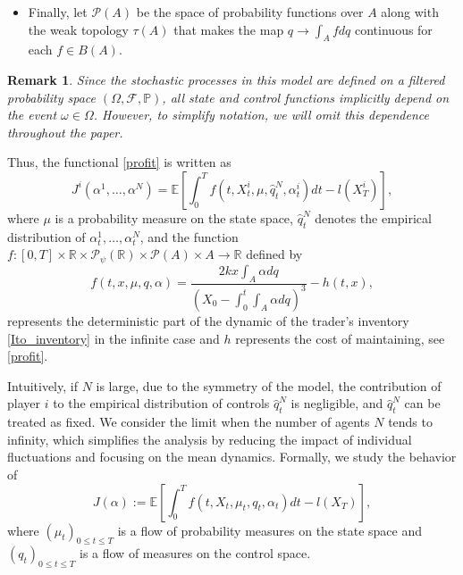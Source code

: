 \documentclass[11pt]{article}
\newtheorem{remark}[thm]{Remark}
\theoremstyle{definition}
\begin{document}
\begin{itemize}
    Throughout this work, all control functions $\alpha$ are considered in a closed-loop form, meaning they depend on the current state of the trader rather than just the initial condition or time. That is, each trader adopts a control strategy of the form $\alpha_t=\hat{\alpha}(t,X_t)$, where $\hat{\alpha}$ is a deterministic function mapping states to actions. This follows the formulation in \citep{carmona2015weakmfgformulation} and ensures that traders react optimally to market conditions at each moment.
    \item Finally, let $\mathcal{P}(A)$ be the space of probability functions over $A$ along with the weak topology $\tau(A)$ that makes the map $q \to \int_{A} f dq$ continuous for each $f \in B(A)$.
\end{itemize}

\begin{remark}
Since the stochastic processes in this model are defined on a filtered probability space $(\Omega, \mathcal{F}, \mathbb{P})$, all state and control functions implicitly depend on the event $\omega \in \Omega$. However, to simplify notation, we will omit this dependence throughout the paper.
\end{remark}


Thus, the functional \eqref{profit} is written as
$$ J^i(\alpha^1, \dots, \alpha^N) = \mathbb{E}\left[\int_0^T f(t, X_t^i, \mu, \hat{q}_t^N, \alpha_t^i) dt - l(X_T^i) \right], $$
where $\mu$ is a probability measure on the state space, $\hat{q}_t^N$ denotes the empirical distribution of $\alpha_t^1, \dots, \alpha_t^N$, and the function $f : [0,T] \times \mathbb{R} \times \mathcal{P}_{\psi}(\mathbb{R}) \times \mathcal{P}(A) \times A \to \mathbb{R}$ defined by
\begin{equation}\label{f}
  f(t, x, \mu, q, \alpha) =  \frac{2k x\displaystyle  \int_A \alpha dq}{\displaystyle \left(X_0 - \int_0^t \int_A \alpha dq \right)^3} - h(t, x),   
\end{equation}
represents the deterministic part of the dynamic of the trader's inventory \eqref{Ito_inventory} in the infinite case and $h$ represents the cost of maintaining, see \eqref{profit}.

Intuitively, if $N$ is large, due to the symmetry of the model, the contribution of player $i$ to the empirical distribution of controls $\hat{q}_t^N$ is negligible, and $\hat{q}_t^N$ can be treated as fixed. We consider the limit when the number of agents \( N \) tends to infinity, which simplifies the analysis by reducing the impact of individual fluctuations and focusing on the mean dynamics. Formally, we study the behavior of
\[
J(\alpha) := \mathbb{E}\left[\int_0^T f(t, X_t, \mu_t, q_t, \alpha_t) dt - l(X_T) \right],
\]
where $(\mu_t)_{0\leq t\leq T}$ is a flow of probability measures on the state space and $(q_t)_{0\leq t\leq T}$ is a flow of measures on the control space.
\end{document}
